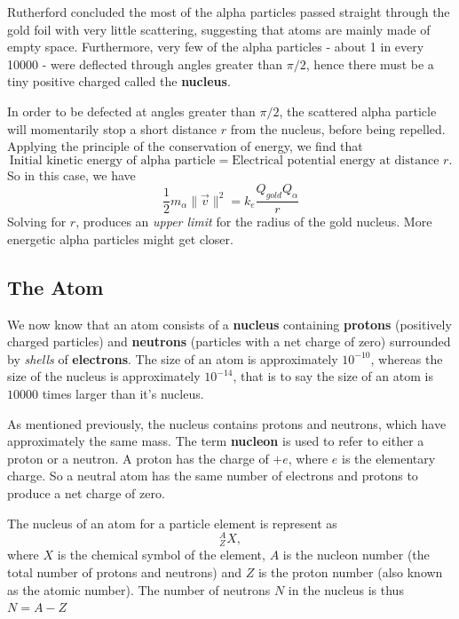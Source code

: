 Rutherford concluded the most of the alpha particles passed straight through the gold foil with very little scattering, suggesting that atoms are mainly made of empty space. Furthermore, very few of the alpha particles - about 1 in every 10000 - were deflected through angles greater than $\pi/2$, hence there must be a tiny positive charged called the \textbf{nucleus}. 

In order to be defected at angles greater than $\pi/2$, the scattered alpha particle will momentarily stop a short distance $r$ from the nucleus, before being repelled. Applying the principle of the conservation of energy, we find that
\begin{equation}
    \text{Initial kinetic energy of alpha particle} = \text{Electrical potential energy at distance } r.
\end{equation}
So in this case, we have
\begin{equation}
    \frac{1}{2} m_{\alpha} \| \vec{v} \|^2 = k_e \frac{Q_{gold} Q_{\alpha}}{r}
\end{equation}
Solving for $r$, produces an \textit{upper limit} for the radius of the gold nucleus. More energetic alpha particles might get closer. 

\subsection{The Atom}

We now know that an atom consists of a \textbf{nucleus} containing \textbf{protons} (positively charged particles) and \textbf{neutrons} (particles with a net charge of zero) surrounded by \textit{shells} of \textbf{electrons}. The size of an atom is approximately $10^{-10}$, whereas the size of the nucleus is approximately $10^{-14}$, that is to say the size of an atom is $10000$ times larger than it's nucleus.  

As mentioned previously, the nucleus contains protons and neutrons, which have approximately the same mass. The term \textbf{nucleon} is used to refer to either a proton or a neutron. A proton has the charge of $+e$, where $e$ is the elementary charge. So a neutral atom has the same number of electrons and protons to produce a net charge of zero.

The nucleus of an atom for a particle element is represent as 
\begin{equation}
    _{Z}^A X,
\end{equation}
where $X$ is the chemical symbol of the element, $A$ is the nucleon number (the total number of protons and neutrons) and $Z$ is the proton number (also known as the atomic number). The number of neutrons $N$ in the nucleus is thus $N = A - Z$

